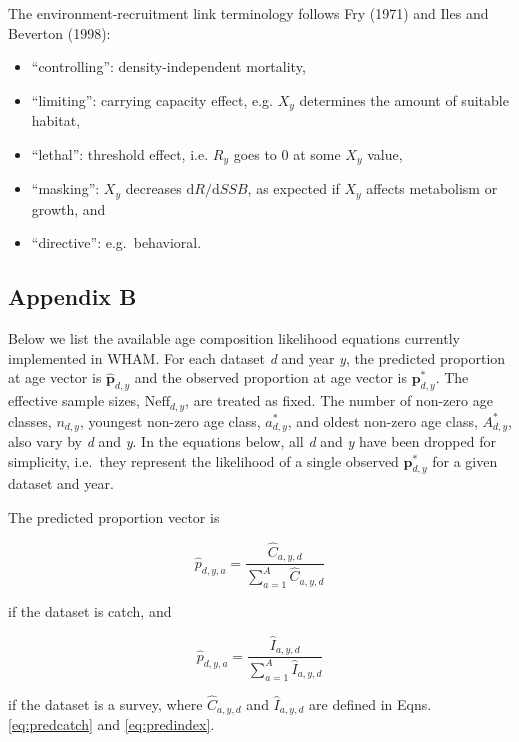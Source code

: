 \documentclass[]{article}
\providecommand{\tightlist}{%
  \setlength{\itemsep}{0pt}\setlength{\parskip}{0pt}}
\begin{document}
\setcounter{table}{0}
\renewcommand{\thetable}{\arabic{table}}
\renewcommand{\arraystretch}{1}

The environment-recruitment link terminology follows Fry (1971) and Iles
and Beverton (1998):

\begin{itemize}
\tightlist
\item
  ``controlling'': density-independent mortality,
\item
  ``limiting'': carrying capacity effect, e.g. \(X_y\) determines the
  amount of suitable habitat,
\item
  ``lethal'': threshold effect, i.e. \(R_y\) goes to 0 at some \(X_y\)
  value,
\item
  ``masking'': \(X_y\) decreases \(\text{d}R/\text{d}SSB\), as expected
  if \(X_y\) affects metabolism or growth, and
\item
  ``directive'': e.g.~behavioral.
\end{itemize}

\pagebreak

\hypertarget{appendix-b}{%
\subsection*{Appendix B}\label{appendix-b}}

Below we list the available age composition likelihood equations
currently implemented in WHAM. For each dataset \emph{d} and year
\emph{y}, the predicted proportion at age vector is
\(\hat{\mathbf{p}}_{d,y}\) and the observed proportion at age vector is
\(\mathbf{p}^*_{d,y}\). The effective sample sizes,
\(\mathrm{Neff}_{d,y}\), are treated as fixed. The number of non-zero
age classes, \(n_{d,y}\), youngest non-zero age class, \(a^{*}_{d,y}\),
and oldest non-zero age class, \(A^{*}_{d,y}\), also vary by \emph{d}
and \emph{y}. In the equations below, all \emph{d} and \emph{y} have
been dropped for simplicity, i.e.~they represent the likelihood of a
single observed \(\mathbf{p}^*_{d,y}\) for a given dataset and year.

The predicted proportion vector is

\[\hat{p}_{d,y,a} = \frac{\hat{C}_{a,y,d}}{\sum_{a=1}^{A} \hat{C}_{a,y,d}}\]

if the dataset is catch, and

\[\hat{p}_{d,y,a} = \frac{\hat{I}_{a,y,d}}{\sum_{a=1}^{A} \hat{I}_{a,y,d}}\]

if the dataset is a survey, where \(\hat{C}_{a,y,d}\) and
\(\hat{I}_{a,y,d}\) are defined in Eqns. \ref{eq:predcatch} and
\ref{eq:predindex}.
\end{document}

